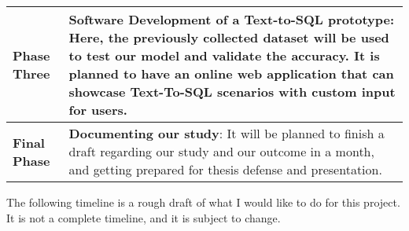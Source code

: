 \begin{tabular}{|l|p{12cm}|}
    \hline
    \textbf{Phase Three} & \textbf{Software Development of a Text-to-SQL prototype}: Here, the previously collected dataset will be used to test our model and validate the accuracy. It is planned to have an online web application that can showcase Text-To-SQL scenarios with custom input for users.                                                                                                                                                                                         \\
    \hline
    \textbf{Final Phase} & \textbf{Documenting our study}: It will be planned to finish a draft regarding our study and our outcome in a month, and getting prepared for thesis defense and presentation.                                                                                                                                                                                                                                                                                          \\
    \hline
\end{tabular}

\newpage

The following timeline is a rough draft of what I would like to do for this project. It is not a complete timeline, and it is subject to change.


